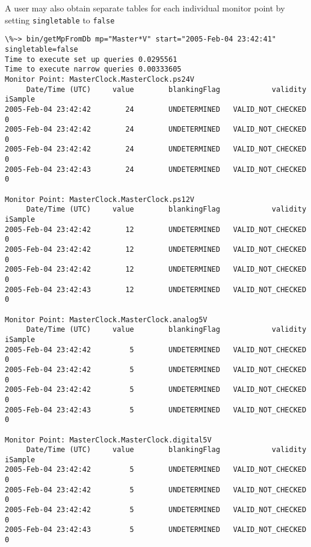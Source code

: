 A user may also obtain separate tables for each individual monitor
point by setting {\tt singletable} to {\tt false}

\begin{verbatim}
\%~> bin/getMpFromDb mp="Master*V" start="2005-Feb-04 23:42:41" singletable=false
Time to execute set up queries 0.0295561
Time to execute narrow queries 0.00333605
Monitor Point: MasterClock.MasterClock.ps24V
     Date/Time (UTC)     value        blankingFlag            validity    iSample
2005-Feb-04 23:42:42        24        UNDETERMINED   VALID_NOT_CHECKED          0
2005-Feb-04 23:42:42        24        UNDETERMINED   VALID_NOT_CHECKED          0
2005-Feb-04 23:42:42        24        UNDETERMINED   VALID_NOT_CHECKED          0
2005-Feb-04 23:42:43        24        UNDETERMINED   VALID_NOT_CHECKED          0

Monitor Point: MasterClock.MasterClock.ps12V
     Date/Time (UTC)     value        blankingFlag            validity    iSample
2005-Feb-04 23:42:42        12        UNDETERMINED   VALID_NOT_CHECKED          0
2005-Feb-04 23:42:42        12        UNDETERMINED   VALID_NOT_CHECKED          0
2005-Feb-04 23:42:42        12        UNDETERMINED   VALID_NOT_CHECKED          0
2005-Feb-04 23:42:43        12        UNDETERMINED   VALID_NOT_CHECKED          0

Monitor Point: MasterClock.MasterClock.analog5V
     Date/Time (UTC)     value        blankingFlag            validity    iSample
2005-Feb-04 23:42:42         5        UNDETERMINED   VALID_NOT_CHECKED          0
2005-Feb-04 23:42:42         5        UNDETERMINED   VALID_NOT_CHECKED          0
2005-Feb-04 23:42:42         5        UNDETERMINED   VALID_NOT_CHECKED          0
2005-Feb-04 23:42:43         5        UNDETERMINED   VALID_NOT_CHECKED          0

Monitor Point: MasterClock.MasterClock.digital5V
     Date/Time (UTC)     value        blankingFlag            validity    iSample
2005-Feb-04 23:42:42         5        UNDETERMINED   VALID_NOT_CHECKED          0
2005-Feb-04 23:42:42         5        UNDETERMINED   VALID_NOT_CHECKED          0
2005-Feb-04 23:42:42         5        UNDETERMINED   VALID_NOT_CHECKED          0
2005-Feb-04 23:42:43         5        UNDETERMINED   VALID_NOT_CHECKED          0
\end{verbatim}

